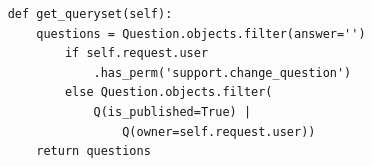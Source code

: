 \documentclass[14pt, a4paper, oneside]{extarticle}
\begin{document}
\begin{enumerate}[wide, labelindent=0pt]
{\begin{verbatim}
    def get_queryset(self):
        questions = Question.objects.filter(answer='') 
            if self.request.user
                .has_perm('support.change_question') 
            else Question.objects.filter(
                Q(is_published=True) | 
                    Q(owner=self.request.user))
        return questions
        \end{verbatim}
    }
\end{enumerate}
\newpage
\end{document}

